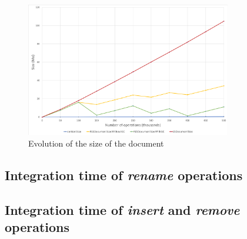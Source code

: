 \documentclass{article}
\theoremstyle{definition}
\begin{document}
\begin{figure}
    \centering
    \includegraphics[width=0.8\textwidth]{img/evolution-document-size.png}
    \caption{Evolution of the size of the document}
    \label{fig:evolution-document-size}
\end{figure}

\subsection{Integration time of \emph{rename} operations}


\subsection{Integration time of \emph{insert} and \emph{remove} operations}




\end{document}
